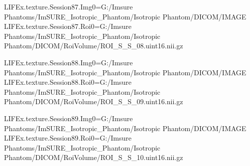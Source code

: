 LIFEx.texture.Session87.Img0=G:/Imsure Phantoms/ImSURE_Isotropic_Phantom/Isotropic Phantom/DICOM/IMAGE
LIFEx.texture.Session87.Roi0=G:/Imsure Phantoms/ImSURE_Isotropic_Phantom/Isotropic Phantom/DICOM/RoiVolume/ROI_S_S_08.uint16.nii.gz

LIFEx.texture.Session88.Img0=G:/Imsure Phantoms/ImSURE_Isotropic_Phantom/Isotropic Phantom/DICOM/IMAGE
LIFEx.texture.Session88.Roi0=G:/Imsure Phantoms/ImSURE_Isotropic_Phantom/Isotropic Phantom/DICOM/RoiVolume/ROI_S_S_09.uint16.nii.gz

LIFEx.texture.Session89.Img0=G:/Imsure Phantoms/ImSURE_Isotropic_Phantom/Isotropic Phantom/DICOM/IMAGE
LIFEx.texture.Session89.Roi0=G:/Imsure Phantoms/ImSURE_Isotropic_Phantom/Isotropic Phantom/DICOM/RoiVolume/ROI_S_S_10.uint16.nii.gz

